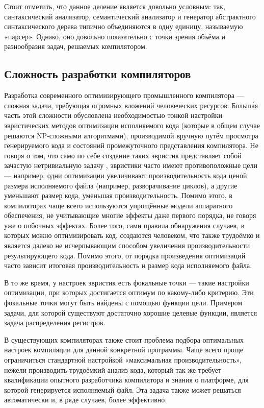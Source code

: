 Стоит отметить, что данное деление является довольно условным: так, синтаксический анализатор, семантический анализатор и генератор абстрактного синтаксического дерева типично объединяются в одну единицу, называемую «парсер». Однако, оно довольно показательно с точки зрения объёма и разнообразия задач, решаемых компилятором.
\subsection{Сложность разработки компиляторов}
Разработка современного оптимизирующего промышленного компилятора --- сложная задача, требующая огромных вложений человеческих ресурсов. Больш\'{а}я часть этой сложности обусловлена необходимостью тонкой настройки эвристических методов оптимизации исполняемого кода (которые в общем случае решаются NP-сложными алгоритмами), производимой вручную путём просмотра генерируемого кода и состояний промежуточного представления компилятора. Не говоря о том, что само по себе создание таких эвристик представляет собой зачастую нетривиальную задачу \cite{Muchnick:2004:EIS:989393.989413,Lavery:1995:IPC:626512.626987,Abraham:1996:MSR:243846.243903}, эвристики часто имеют противоположные цели --- например, одни оптимизации увеличивают производительность кода ценой размера исполняемого файла (например, разворачивание циклов), а другие уменьшают размер кода, уменьшая производительность. Помимо этого, в компиляторах чаще всего используются упрощённые модели аппаратного обеспечения, не учитывающие многие эффекты даже первого порядка, не говоря уже о побочных эффектах. Более того, сами правила обнаружения случаев, в которых можно оптимизировать код, создаются человеком, что также трудоёмко и является далеко не исчерпывающим способом увеличения производительности результирующего кода. Помимо этого, от порядка произведения оптимизаций часто зависит итоговая производительность и размер кода исполняемого файла.

В то же время, у настроек эвристик есть фокальные точки --- такие настройки оптимизации, при которых достигается оптимум по какому-либо критерию. Эти фокальные точки могут быть найдены с помощью функции цели. Примером задачи, для которой существуют достаточно хорошие целевые функции, является задача распределения регистров.

В существующих компиляторах также стоит проблема подбора оптимальных настроек компиляции для данной конкретной программы. Чаще всего проще ограничиться стандартной настройкой «максимальная производительность», нежели производить трудоёмкий анализ кода, который так же требует квалификации опытного разработчика компилятора и знания о платформе, для которой генерируется исполняемый файл. Эта задача также может решаться автоматически и, в ряде случаев, более эффективно.

